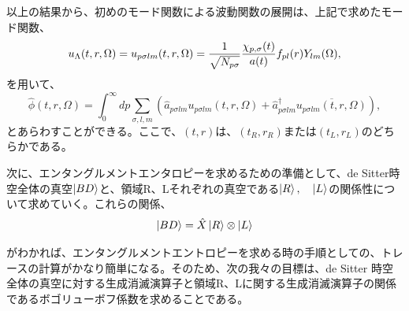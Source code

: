 以上の結果から、初めのモード関数による波動関数の展開は、上記で求めたモード関数、
\begin{equation}
 u_{\Lambda}(t,r,\Omega)=u_{p\sigma lm}(t,r,\Omega)={1\over\sqrt{N_{p\sigma}}}
           {\chi_{p,\sigma}(t)\over a(t)}f_{pl}(r)Y_{lm}(\Omega),
\label{Normmode}
\end{equation}
を用いて、
\begin{equation}
\hat\phi(t,r,\Omega)=\int_0^\infty dp\sum_{\sigma,l,m}
 \left(\hat a_{p\sigma lm}u_{p\sigma lm}(t,r,\Omega)+
     \hat a_{p\sigma lm}^{\dag}\overline{u_{p\sigma lm}(t,r,\Omega)}\right),
\end{equation}
とあらわすことができる。ここで、$(t,r)$は、$(t_R,r_R)$または$(t_L,r_L)$のどちらかである。

次に、エンタングルメントエンタロピーを求めるための準備として、de Sitter時空全体の真空$\ket{BD}$と、領域R、Lそれぞれの真空である$\ket{R}, \quad \ket{L}$の関係性について求めていく。これらの関係、
\begin{equation}
  \ket{BD}=\hat{X}\ket{R}\otimes \ket{L}
\end{equation}

がわかれば、エンタングルメントエントロピーを求める時の手順としての、トレースの計算がかなり簡単になる。そのため、次の我々の目標は、de Sitter 時空全体の真空に対する生成消滅演算子と領域R、Lに関する生成消滅演算子の関係であるボゴリューボフ係数を求めることである。


